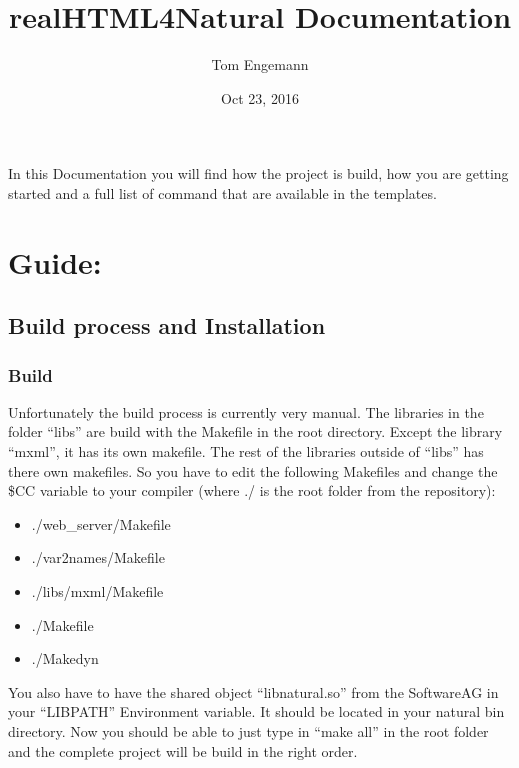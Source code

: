 \documentclass[letterpaper,10pt,english]{sphinxmanual}
\title{realHTML4Natural Documentation}
\date{Oct 23, 2016}
\author{Tom Engemann}
\begin{document}
\maketitle
\tableofcontents
{}\label{index::doc}


In this Documentation you will find how the project is build, how you are getting started and a full list of command that are available in the templates.


\chapter{Guide:}
\label{index:realhtml4natural-documentation}\label{index:guide}

\section{Build process and Installation}
\label{installation::doc}\label{installation:build-process-and-installation}

\subsection{Build}
\label{installation:build}
Unfortunately the build process is currently very manual.
The libraries in the folder ``libs'' are build with the Makefile in the root directory. Except the library ``mxml'', it has its own makefile.
The rest of the libraries outside of ``libs'' has there own makefiles.
So you have to edit the following Makefiles and change the \$CC variable to your compiler (where ./ is the root folder from the repository):
\begin{itemize}
\item {} 
./web\_server/Makefile

\item {} 
./var2names/Makefile

\item {} 
./libs/mxml/Makefile

\item {} 
./Makefile

\item {} 
./Makedyn

\end{itemize}

You also have to have the shared object ``libnatural.so'' from the SoftwareAG in your ``LIBPATH'' Environment variable. It should be located in your natural bin directory.
Now you should be able to just type in ``make all'' in the root folder and the complete project will be build in the right order.
\end{document}
